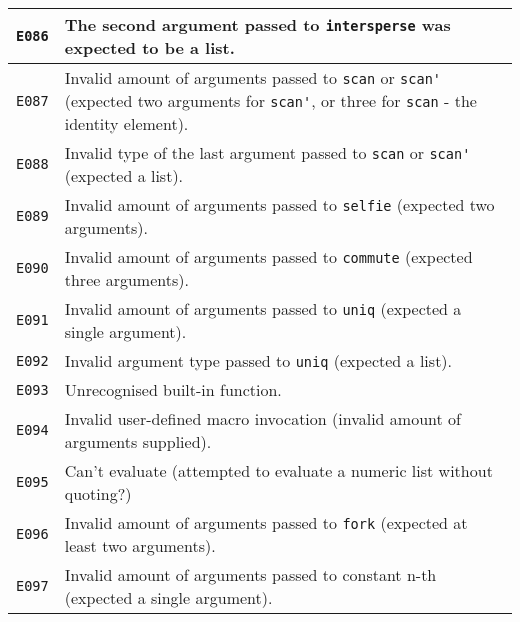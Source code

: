 \begin{longtable}{ | p{6em} | p{34em} | }
\verb|E086|          & The second argument passed to \verb|intersperse| was expected to be a list.                                                                    \\ \hline
\verb|E087|          & Invalid amount of arguments passed to \verb|scan| or \verb|scan'| (expected two arguments for \verb|scan'|, or three for \verb|scan| - the identity element). \\ \hline
\verb|E088|          & Invalid type of the last argument passed to \verb|scan| or \verb|scan'| (expected a list).                                                     \\ \hline
\verb|E089|          & Invalid amount of arguments passed to \verb|selfie| (expected two arguments).                                                                  \\ \hline
\verb|E090|          & Invalid amount of arguments passed to \verb|commute| (expected three arguments).                                                               \\ \hline
\verb|E091|          & Invalid amount of arguments passed to \verb|uniq| (expected a single argument).                                                                \\ \hline
\verb|E092|          & Invalid argument type passed to \verb|uniq| (expected a list).                                                                                 \\ \hline
\verb|E093|          & Unrecognised built-in function.                                                                                                                \\ \hline
\verb|E094|          & Invalid user-defined macro invocation (invalid amount of arguments supplied).                                                                  \\ \hline
\verb|E095|          & Can't evaluate (attempted to evaluate a numeric list without quoting?)                                                                         \\ \hline
\verb|E096|          & Invalid amount of arguments passed to \verb|fork| (expected at least two arguments).                                                           \\ \hline
\verb|E097|          & Invalid amount of arguments passed to constant n-th (expected a single argument).                                                              \\ \hline

\end{longtable}
